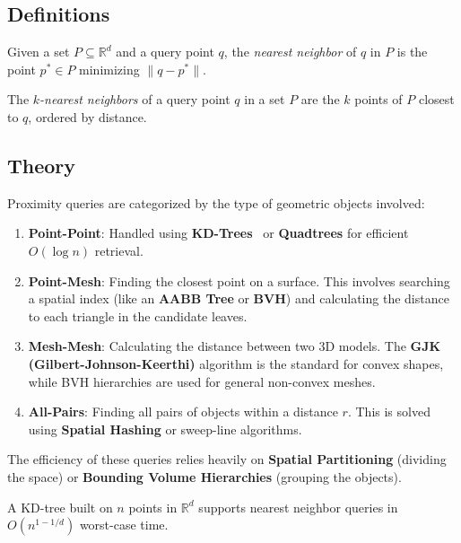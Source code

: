 \subsection{Definitions}

\begin{definition}\label{def:nearest_neighbor}
Given a set $P \subseteq \mathbb{R}^d$ and a query point $q$, the \emph{nearest neighbor} of $q$ in $P$ is the point $p^* \in P$ minimizing $\|q - p^*\|$.
\end{definition}

\begin{definition}\label{def:knn}
The \emph{$k$-nearest neighbors} of a query point $q$ in a set $P$ are the $k$ points of $P$ closest to $q$, ordered by distance.
\end{definition}

\subsection{Theory}

Proximity queries are categorized by the type of geometric objects involved:
\begin{enumerate}
\item \textbf{Point-Point}: Handled using \textbf{KD-Trees}~\cite{bentley1975} or \textbf{Quadtrees} for efficient $O(\log n)$ retrieval.
\item \textbf{Point-Mesh}: Finding the closest point on a surface. This involves searching a spatial index (like an \textbf{AABB Tree} or \textbf{BVH}) and calculating the distance to each triangle in the candidate leaves.
\item \textbf{Mesh-Mesh}: Calculating the distance between two 3D models. The \textbf{GJK (Gilbert-Johnson-Keerthi)} algorithm is the standard for convex shapes, while BVH hierarchies are used for general non-convex meshes.
\item \textbf{All-Pairs}: Finding all pairs of objects within a distance $r$. This is solved using \textbf{Spatial Hashing} or sweep-line algorithms.
\end{enumerate}

The efficiency of these queries relies heavily on \textbf{Spatial Partitioning} (dividing the space) or \textbf{Bounding Volume Hierarchies} (grouping the objects).

\begin{theorem}\label{thm:kdtree_nn}
A KD-tree built on $n$ points in $\mathbb{R}^d$ supports nearest neighbor queries in $O(n^{1-1/d})$ worst-case time.
\end{theorem}


